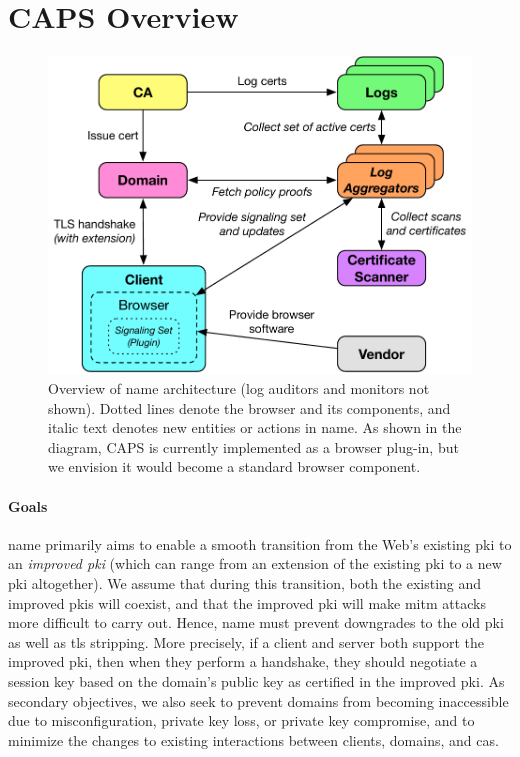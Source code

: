 \section{CAPS Overview}
\label{sec:design:overview}

\begin{figure}
  \centering
  \includegraphics[width=.9\linewidth]{fig/arch}
  \caption{Overview of \ac{name} architecture (log auditors and monitors not
  shown). Dotted lines denote the browser and its components, and italic text
denotes new entities or actions in \ac{name}.  As shown in the diagram,
CAPS is currently implemented as a browser plug-in, but we envision it
would become a standard browser component.
  }
  \label{fig:overview}
\end{figure}

\paragraph{Goals}
\ac{name} primarily aims to enable a smooth transition from the Web's existing
\ac{pki} to an \emph{improved \ac{pki}} (which can range from an extension of
the existing \ac{pki} to a new \ac{pki} altogether). We assume that during this
transition, both the existing and improved \acp{pki} will coexist, and that the
improved \ac{pki} will make \ac{mitm} attacks more difficult to carry out.
Hence, \ac{name} must prevent downgrades to the old \ac{pki} as well as \ac{tls}
stripping. More precisely, if a client and server both support the improved
\ac{pki}, then when they perform a handshake, they should negotiate a session
key based on the domain's public key as certified in the improved \ac{pki}. As
secondary objectives, we also seek to prevent domains from becoming inaccessible
due to misconfiguration, private key loss, or private key compromise, and to
minimize the changes to existing interactions between clients, domains, and
\acp{ca}.

